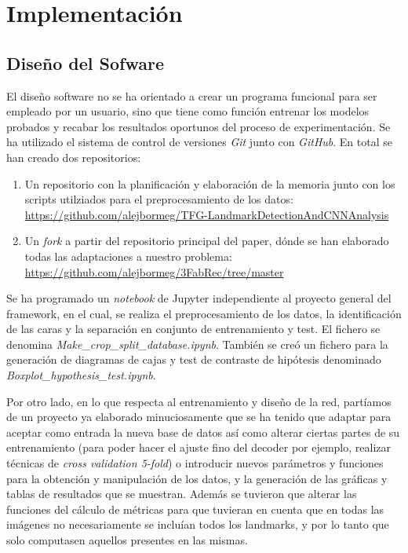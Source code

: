 \chapter{Implementación}

\section{Diseño del Sofware}

\noindent El diseño software no se ha orientado a crear un programa funcional para ser empleado por un usuario, sino que tiene como función entrenar los modelos probados y recabar los resultados oportunos del proceso de experimentación. Se ha utilizado el sistema de control de versiones \textit{Git} junto con \textit{GitHub}. En total se han creado dos repositorios:

\begin{enumerate}
    \item Un repositorio con la planificación y elaboración de la memoria junto con los scripts utilziados para el preprocesamiento de los datos: \url{https://github.com/alejbormeg/TFG-LandmarkDetectionAndCNNAnalysis}
    \item Un \textit{fork} a partir del repositorio principal del paper, dónde se han elaborado todas las adaptaciones a nuestro problema: \url{https://github.com/alejbormeg/3FabRec/tree/master}
\end{enumerate}

\medskip

\noindent Se ha programado un \textit{notebook} de Jupyter independiente al proyecto general del framework, en el cual, se realiza el preprocesamiento de los datos, la identificación de las caras y la separación en conjunto de entrenamiento y test. El fichero se denomina \textit{Make\_crop\_split\_database.ipynb}. También se creó un fichero para la generación de diagramas de cajas y test de contraste de hipótesis denominado \textit{Boxplot\_hypothesis\_test.ipynb}.

\medskip

\noindent Por otro lado, en lo que respecta al entrenamiento y diseño de la red, partíamos de un proyecto ya elaborado minuciosamente que se ha tenido que adaptar para aceptar como entrada la nueva base de datos así como alterar ciertas partes de su entrenamiento (para poder hacer el ajuste fino del decoder por ejemplo, realizar técnicas de \textit{cross validation 5-fold}) o introducir nuevos parámetros y funciones para la obtención y manipulación de los datos, y la generación de las gráficas y tablas de resultados que se muestran. Además se tuvieron que alterar las funciones del cálculo de métricas para que tuvieran en cuenta que en todas las imágenes no necesariamente se incluían todos los landmarks, y por lo tanto que solo computasen aquellos presentes en las mismas.

